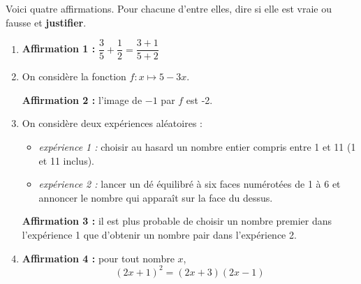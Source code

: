 \documentclass[exercice]{thedocument}%
\begin{document}
%
Voici quatre affirmations. Pour chacune d'entre elles, dire si elle est vraie
ou fausse et {\bfseries justifier}.
\begin{enumerate}[label=\arabic*.]
\item {\bfseries Affirmation 1 : }$\dfrac35+\dfrac12=\dfrac{3+1}{5+2}$
\item On considère la fonction $f:x\mapsto5-3x$.\par
{\bfseries Affirmation 2 : }l'image de $-1$ par $f$ est -2.\vskip5pt
\item On considère deux expériences aléatoires :
\begin{itemize}[label=$-$]
    \item {\itshape expérience 1 : }choisir au hasard un nombre entier compris entre
    1 et 11 (1 et 11 inclus).
    \item {\itshape expérience 2 : }lancer un dé équilibré à six faces numérotées
    de 1 à 6 et annoncer le nombre qui apparaît sur la face du dessus.
\end{itemize}
{\bfseries Affirmation 3 : }il est plus probable de choisir un nombre premier dans
l'expérience 1 que d'obtenir un nombre pair dans l'expérience 2.
\item {\bfseries Affirmation 4 : }pour tout nombre $x$,$$(2x+1)^2=(2x+3)(2x-1)$$
\end{enumerate}
\end{document}
